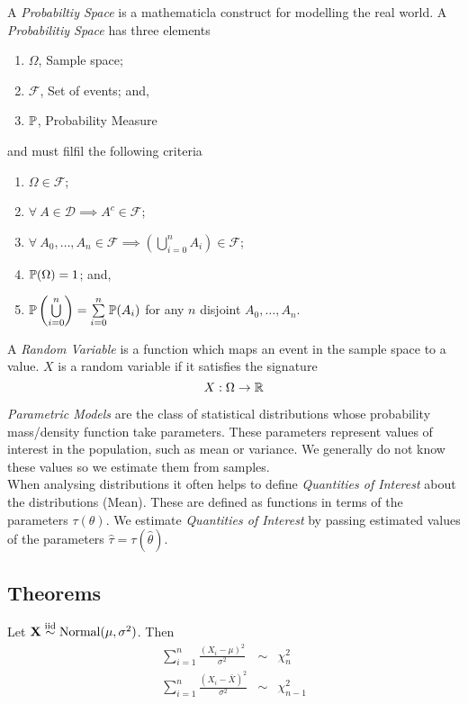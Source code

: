 \documentclass[11pt,a4paper]{article}
\begin{document}
A \textit{Probabiltiy Space} is a mathematicla construct for modelling the real world. A \textit{Probabilitiy Space} has three elements
\begin{enumerate}
	\item $\Omega$, Sample space;
	\item $\mathcal{F}$, Set of events; and,
	\item $\mathbb{P}$, Probability Measure
\end{enumerate}
and must filfil the following criteria
\begin{enumerate}
	\item $\Omega\in\mathcal{F}$;
	\item $\forall\ A\in\mathcal{D}\implies A^c\in\mathcal{F}$;
	\item $\forall\ A_0,\dots,A_n\in\mathcal{F}\implies\left(\bigcup\limits_{i=0}^nA_i\right)\in\mathcal{F}$;
	\item $\mathbb{P}(\Omega)=1$; and,
	\item $\mathbb{P}\left(\bigcup\limits_{i=0}^n\right)=\sum\limits_{i=0}^n\mathbb{P}(A_i)$ for any $n$ disjoint $A_0,\dots,A_n$.
\end{enumerate}

A \textit{Random Variable} is a function which maps an event in the sample space to a value. $X$ is a random variable if it satisfies the signature
$$X:\Omega\to\mathbb{R}$$

\textit{Parametric Models} are the class of statistical distributions whose probability mass/density function take parameters. These parameters represent values of interest in the population, such as mean or variance. We generally do not know these values so we estimate them from samples.\\

When analysing distributions it often helps to define \textit{Quantities of Interest} about the distributions (\eg Mean). These are defined as functions in terms of the parameters $\tau(\theta)$. We estimate \textit{Quantities of Interest} by passing estimated values of the parameters $\hat{\tau}=\tau(\hat{\theta})$.

\subsection{Theorems}

Let $\textbf{X}\overset{\text{iid}}{\sim}\text{Normal}(\mu,\sigma^2)$. Then
\[\begin{array}{rcl}
{\displaystyle\sum_{i=1}^n\frac{(X_i-\mu)^2}{\sigma^2}}&\sim&\chi^2_n\\
{\displaystyle\sum_{i=1}^n\frac{(X_i-\bar{X})^2}{\sigma^2}}&\sim&\chi^2_{n-1}\\
\end{array}\]
\end{document}
